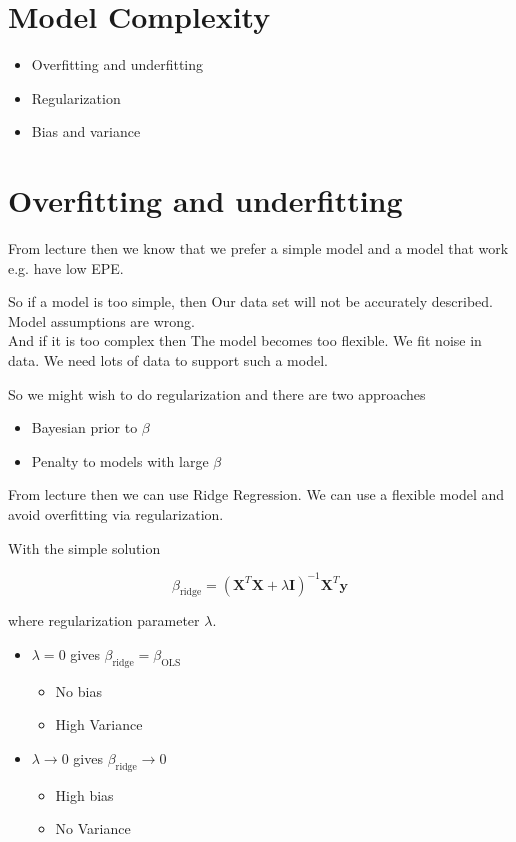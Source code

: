 \section{Model Complexity}

\begin{itemize}
  \item Overfitting and underfitting
  \item Regularization
  \item Bias and variance
\end{itemize}



\section{Overfitting and underfitting}

From lecture \cite[p.~7]{lecture2} then we know that we prefer a simple model and a model that work e.g. have low EPE.

So if a model is too simple, then Our data set will not be accurately described. Model assumptions are wrong.\\

And if it is too complex then The model becomes too flexible. We fit noise in data. We need lots of data to support such a model.

So we might wish to do regularization and there are two approaches

\begin{itemize}
  \item Bayesian prior to $\beta$
  \item Penalty to models with large $\beta$
\end{itemize}

From lecture \cite[p.~18]{lecture2} then we can use Ridge Regression. We can use a flexible model and avoid overfitting via regularization.

With the simple solution

\[
    \beta_{\text{ridge}} = (\bm{X}^T\bm{X} + \lambda \bm{I})^{-1} \bm{X}^T\bm{y}
\]

where regularization parameter $\lambda$.

\begin{itemize}
  \item $\lambda = 0$ gives $\beta_{\text{ridge}} = \beta_{\text{OLS}}$
      \begin{itemize}
        \item No bias
        \item High Variance
      \end{itemize}
  \item $\lambda \rightarrow 0$ gives $\beta_{\text{ridge}} \rightarrow 0$
      \begin{itemize}
        \item High bias
        \item No Variance
      \end{itemize}
\end{itemize}


